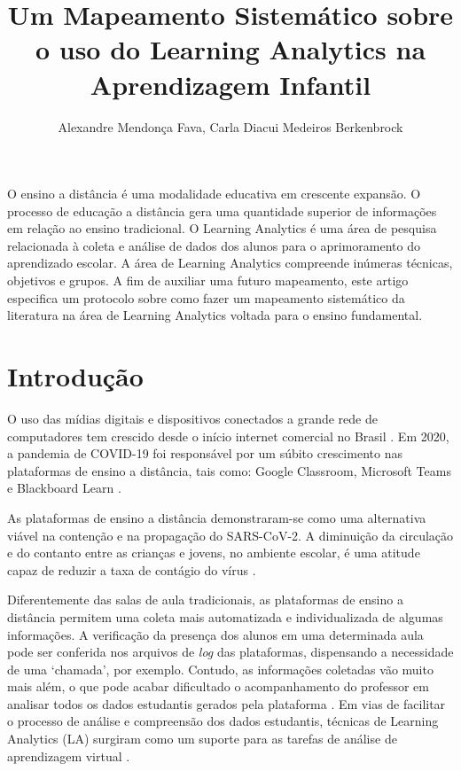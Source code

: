\documentclass[12pt]{article}
\title{Um Mapeamento Sistemático sobre o uso do Learning Analytics na Aprendizagem Infantil}
\author{Alexandre Mendonça Fava\inst{1}, Carla Diacui Medeiros Berkenbrock\inst{1}}
\begin{document}
 

\maketitle

\begin{resumo} 
O ensino a distância é uma modalidade educativa em crescente expansão. O processo de educação a distância gera uma quantidade superior de informações em relação ao ensino tradicional. O Learning Analytics é uma área de pesquisa relacionada à coleta e análise de dados dos alunos para o aprimoramento do aprendizado escolar. A área de Learning Analytics compreende inúmeras técnicas, objetivos e grupos. A fim de auxiliar uma futuro mapeamento, este artigo especifica um protocolo sobre como fazer um mapeamento sistemático da literatura na área de Learning Analytics voltada para o ensino fundamental.
\end{resumo}


\section{Introdução}\label{secao:introducao}

O uso das mídias digitais e dispositivos conectados a grande rede de computadores tem crescido desde o início internet comercial no Brasil \cite{barbosa2019pesquisa}. Em 2020, a pandemia de COVID-19 foi responsável por um súbito crescimento nas plataformas de ensino  a  distância, tais como: Google Classroom, Microsoft Teams e Blackboard Learn \cite{da2020inventar}.

As plataformas de ensino a distância demonstraram-se como uma alternativa viável na contenção e na propagação do SARS-CoV-2. A diminuição da circulação e do contanto entre as crianças e jovens, no ambiente escolar, é uma atitude capaz de reduzir a taxa de contágio do vírus \cite{ferguson2020report}. 

Diferentemente das salas de aula tradicionais, as plataformas de ensino a distância permitem uma coleta mais automatizada e individualizada de algumas informações. A verificação da presença dos alunos em uma determinada aula pode ser conferida nos arquivos de \textit{log} das plataformas, dispensando a necessidade de uma `chamada', por exemplo. Contudo, as informações coletadas vão muito mais além, o que pode acabar dificultado o acompanhamento do professor em analisar todos os dados estudantis gerados pela plataforma \cite{de2019tendencias}. Em vias de facilitar o processo de análise e compreensão dos dados estudantis, técnicas de Learning Analytics (LA) surgiram como um suporte para as tarefas de análise de aprendizagem virtual \cite{ruiperez2015alas}.
\end{document}

